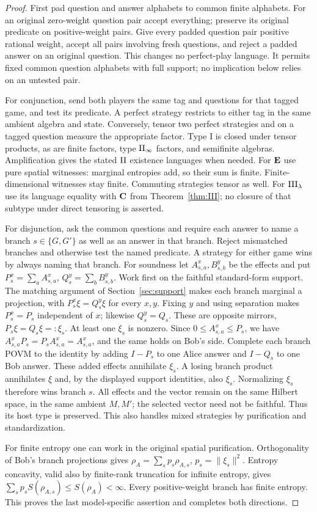 \begin{proof}
First pad question and answer alphabets to common finite alphabets. For an original zero-weight question pair accept everything; preserve its original predicate on positive-weight pairs. Give every padded question pair positive rational weight, accept all pairs involving fresh questions, and reject a padded answer on an original question. This changes no perfect-play language. It permits fixed common question alphabets with full support; no implication below relies on an untested pair.

For conjunction, send both players the same tag and questions for that tagged game, and test its predicate. A perfect strategy restricts to either tag in the same ambient algebra and state. Conversely, tensor two perfect strategies and on a tagged question measure the appropriate factor. Type I is closed under tensor products, as are finite factors, type $\mathrm{II}_\infty$ factors, and semifinite algebras. Amplification gives the stated $\mathrm{II}$ existence languages when needed. For $\mathbf E$ use pure spatial witnesses: marginal entropies add, so their sum is finite. Finite-dimensional witnesses stay finite. Commuting strategies tensor as well. For $\mathrm{III}_\lambda$ use its language equality with $\mathbf C$ from Theorem~\ref{thm:III}; no closure of that subtype under direct tensoring is asserted.

For disjunction, ask the common questions and require each answer to name a branch $s\in\{G,G'\}$ as well as an answer in that branch. Reject mismatched branches and otherwise test the named predicate. A strategy for either game wins by always naming that branch. For soundness let $A_{s,a}^x,B_{s,b}^y$ be the effects and put $P_s^x=\sum_aA_{s,a}^x$, $Q_s^y=\sum_bB_{s,b}^y$. Work first on the faithful standard-form support. The matching argument of Section~\ref{sec:support} makes each branch marginal a projection, with $P_s^x\xi=Q_s^y\xi$ for every $x,y$. Fixing $y$ and using separation makes $P_s^x=P_s$ independent of $x$; likewise $Q_s^y=Q_s$. These are opposite mirrors, $P_s\xi=Q_s\xi=:\xi_s$. At least one $\xi_s$ is nonzero. Since $0\leq A_{s,a}^x\leq P_s$, we have $A_{s,a}^xP_s=P_sA_{s,a}^x=A_{s,a}^x$, and the same holds on Bob's side. Complete each branch POVM to the identity by adding $I-P_s$ to one Alice answer and $I-Q_s$ to one Bob answer. These added effects annihilate $\xi_s$. A losing branch product annihilates $\xi$ and, by the displayed support identities, also $\xi_s$. Normalizing $\xi_s$ therefore wins branch $s$. All effects and the vector remain on the same Hilbert space, in the same ambient $M,M'$; the selected vector need not be faithful. Thus its host type is preserved. This also handles mixed strategies by purification and standardization.

For finite entropy one can work in the original spatial purification. Orthogonality of Bob's branch projections gives $\rho_A=\sum_s p_s\rho_{A,s}$, $p_s=\|\xi_s\|^2$. Entropy concavity, valid also by finite-rank truncation for infinite entropy, gives $\sum_s p_sS(\rho_{A,s})\leq S(\rho_A)<\infty$. Every positive-weight branch has finite entropy. This proves the last model-specific assertion and completes both directions.
\end{proof}

